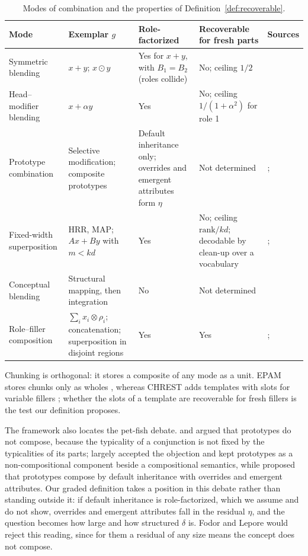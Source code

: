 \documentclass[10pt]{article}
\theoremstyle{plain}
\theoremstyle{remark}
\begin{document}
\begin{table}[h]
  \caption{Modes of combination and the properties of Definition~\ref{def:recoverable}.}
  \label{tab:forms}
  \centering\small
  \begin{tabularx}{\linewidth}{@{}P{2.5cm}P{2.9cm}P{2.2cm}P{2.5cm}Y@{}}
    \toprule
    Mode & Exemplar $g$ & Role-factorized & Recoverable for fresh parts & Sources \\
    \midrule
    Symmetric blending & $x + y$; $x \odot y$ & Yes for $x + y$, with $B_1 = B_2$ (roles collide) & No; ceiling $1/2$ & \citet{mitchell2010} \\
    Head--modifier blending & $x + \alpha y$ & Yes & No; ceiling $1/(1+\alpha^2)$ for role 1 & \citet{mitchell2010} \\
    Prototype combination & Selective modification; composite prototypes & Default inheritance only; overrides and emergent attributes form $\eta$ & Not determined & \citet{smith1988}; \citet{hampton1987} \\
    Fixed-width superposition & HRR, MAP; $Ax + By$ with $m < kd$ & Yes & No; ceiling $\mathrm{rank}/kd$; decodable by clean-up over a vocabulary & \citet{plate1995,plate2003}; \citet{frady2018} \\
    Conceptual blending & Structural mapping, then integration & No & Not determined & \citet{fauconnier2002} \\
    Role--filler composition & $\sum_i x_i \otimes \rho_i$; concatenation; superposition in disjoint regions & Yes & Yes & \citet{smolensky1990}; \citet{wiedemer2024} \\
    \bottomrule
  \end{tabularx}
\end{table}

\noindent
Chunking is orthogonal: it stores a composite of any mode as a unit. EPAM stores chunks only as wholes \citep{feigenbaum1984}, whereas CHREST adds templates with slots for variable fillers \citep{gobet1996templates,gobet2000}; whether the slots of a template are recoverable for fresh fillers is the test our definition proposes.

The framework also locates the pet-fish debate. \citet{osherson1981} and \citet{fodor1996} argued that prototypes do not compose, because the typicality of a conjunction is not fixed by the typicalities of its parts; \citet{kamp1995} largely accepted the objection and kept prototypes as a non-compositional component beside a compositional semantics, while \citet{hampton1987,hampton2012} proposed that prototypes compose by default inheritance with overrides and emergent attributes. Our graded definition takes a position in this debate rather than standing outside it: if default inheritance is role-factorized, which we assume and do not show, overrides and emergent attributes fall in the residual $\eta$, and the question becomes how large and how structured $\delta$ is. Fodor and Lepore would reject this reading, since for them a residual of any size means the concept does not compose.
\end{document}
